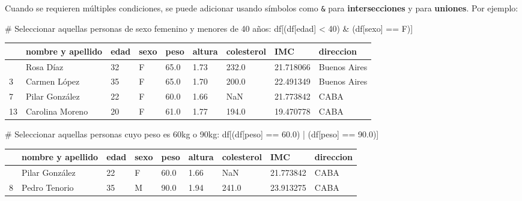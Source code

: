 \documentclass[
  letterpaper,
  DIV=11,
  numbers=noendperiod]{scrreprt}
\newenvironment{Shaded}{\begin{snugshade}}{\end{snugshade}}
\newcommand{\CommentTok}[1]{\textcolor[rgb]{0.37,0.37,0.37}{#1}}
\newcommand{\DecValTok}[1]{\textcolor[rgb]{0.68,0.00,0.00}{#1}}
\newcommand{\FloatTok}[1]{\textcolor[rgb]{0.68,0.00,0.00}{#1}}
\newcommand{\NormalTok}[1]{\textcolor[rgb]{0.00,0.23,0.31}{#1}}
\newcommand{\OperatorTok}[1]{\textcolor[rgb]{0.37,0.37,0.37}{#1}}
\newcommand{\StringTok}[1]{\textcolor[rgb]{0.13,0.47,0.30}{#1}}
\begin{document}
Cuando se requieren múltiples condiciones, se puede adicionar usando
símbolos como \texttt{\&} para \textbf{intersecciones} y
\texttt{\textbar{}} para \textbf{uniones}. Por ejemplo:

\begin{Shaded}
\begin{Highlighting}[]
\CommentTok{\# Seleccionar aquellas personas de sexo femenino y menores de 40 años:}
\NormalTok{df[(df[}\StringTok{\textquotesingle{}edad\textquotesingle{}}\NormalTok{] }\OperatorTok{\textless{}} \DecValTok{40}\NormalTok{) }\OperatorTok{\&}\NormalTok{ (df[}\StringTok{\textquotesingle{}sexo\textquotesingle{}}\NormalTok{] }\OperatorTok{==} \StringTok{\textquotesingle{}F\textquotesingle{}}\NormalTok{)]}
\end{Highlighting}
\end{Shaded}

\begin{longtable}[]{@{}lllllllll@{}}
\toprule\noalign{}
& nombre y apellido & edad & sexo & peso & altura & colesterol & IMC &
direccion \\
\midrule\noalign{}
\endhead
\bottomrule\noalign{}
\endlastfoot
1 & Rosa Díaz & 32 & F & 65.0 & 1.73 & 232.0 & 21.718066 & Buenos
Aires \\
3 & Carmen López & 35 & F & 65.0 & 1.70 & 200.0 & 22.491349 & Buenos
Aires \\
7 & Pilar González & 22 & F & 60.0 & 1.66 & NaN & 21.773842 & CABA \\
13 & Carolina Moreno & 20 & F & 61.0 & 1.77 & 194.0 & 19.470778 &
CABA \\
\end{longtable}

\begin{Shaded}
\begin{Highlighting}[]
\CommentTok{\# Seleccionar aquellas personas cuyo peso es 60kg o 90kg:}
\NormalTok{df[(df[}\StringTok{\textquotesingle{}peso\textquotesingle{}}\NormalTok{] }\OperatorTok{==} \FloatTok{60.0}\NormalTok{) }\OperatorTok{|}\NormalTok{ (df[}\StringTok{\textquotesingle{}peso\textquotesingle{}}\NormalTok{] }\OperatorTok{==} \FloatTok{90.0}\NormalTok{)]}
\end{Highlighting}
\end{Shaded}

\begin{longtable}[]{@{}lllllllll@{}}
\toprule\noalign{}
& nombre y apellido & edad & sexo & peso & altura & colesterol & IMC &
direccion \\
\midrule\noalign{}
\endhead
\bottomrule\noalign{}
\endlastfoot
7 & Pilar González & 22 & F & 60.0 & 1.66 & NaN & 21.773842 & CABA \\
8 & Pedro Tenorio & 35 & M & 90.0 & 1.94 & 241.0 & 23.913275 & CABA \\
\end{longtable}
\end{document}
